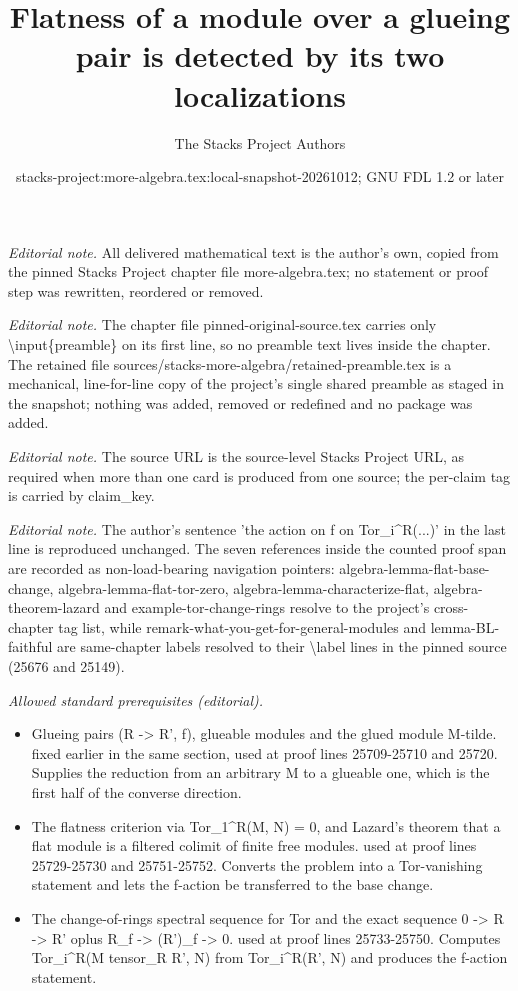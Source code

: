 \documentclass[10pt,a4paper]{amsart}
\title{Flatness of a module over a glueing pair is detected by its two localizations}
\author{The Stacks Project Authors}
\date{stacks-project:more-algebra.tex:local-snapshot-20261012; GNU FDL 1.2 or later}
\theoremstyle{plain}
\theoremstyle{definition}
\theoremstyle{remark}
\numberwithin{equation}{subsection}
\begin{document}
\maketitle
\setcounter{subsection}{1}
\noindent\textit{Editorial note.} All delivered mathematical text is the author's own, copied from the pinned Stacks Project chapter file more-algebra.tex; no statement or proof step was rewritten, reordered or removed.\par\medskip
\noindent\textit{Editorial note.} The chapter file pinned-original-source.tex carries only \textbackslash{}input\{preamble\} on its first line, so no preamble text lives inside the chapter. The retained file sources/stacks-more-algebra/retained-preamble.tex is a mechanical, line-for-line copy of the project's single shared preamble as staged in the snapshot; nothing was added, removed or redefined and no package was added.\par\medskip
\noindent\textit{Editorial note.} The source URL is the source-level Stacks Project URL, as required when more than one card is produced from one source; the per-claim tag is carried by claim\_key.\par\medskip
\noindent\textit{Editorial note.} The author's sentence 'the action on f on Tor\_i\textasciicircum{}R(...)' in the last line is reproduced unchanged. The seven references inside the counted proof span are recorded as non-load-bearing navigation pointers: algebra-lemma-flat-base-change, algebra-lemma-flat-tor-zero, algebra-lemma-characterize-flat, algebra-theorem-lazard and example-tor-change-rings resolve to the project's cross-chapter tag list, while remark-what-you-get-for-general-modules and lemma-BL-faithful are same-chapter labels resolved to their \textbackslash{}label lines in the pinned source (25676 and 25149).\par\medskip
\noindent\textit{Allowed standard prerequisites (editorial).}\begin{itemize}
\item Glueing pairs (R -> R', f), glueable modules and the glued module M-tilde. fixed earlier in the same section, used at proof lines 25709-25710 and 25720. Supplies the reduction from an arbitrary M to a glueable one, which is the first half of the converse direction.
\item The flatness criterion via Tor\_1\textasciicircum{}R(M, N) = 0, and Lazard's theorem that a flat module is a filtered colimit of finite free modules. used at proof lines 25729-25730 and 25751-25752. Converts the problem into a Tor-vanishing statement and lets the f-action be transferred to the base change.
\item The change-of-rings spectral sequence for Tor and the exact sequence 0 -> R -> R' oplus R\_f -> (R')\_f -> 0. used at proof lines 25733-25750. Computes Tor\_i\textasciicircum{}R(M tensor\_R R', N) from Tor\_i\textasciicircum{}R(R', N) and produces the f-action statement.
\end{itemize}\medskip
\end{document}
